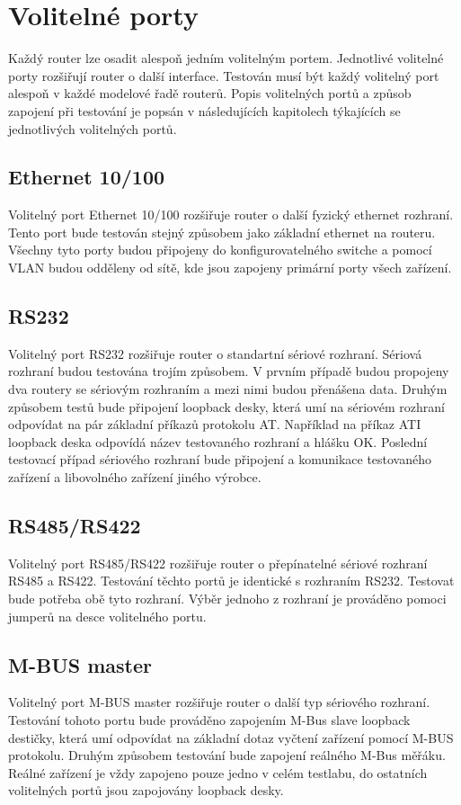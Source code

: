 \section{Volitelné porty}
Každý router lze osadit alespoň jedním volitelným portem. Jednotlivé volitelné porty rozšiřují router o další interface. Testován musí být každý volitelný port alespoň v každé modelové řadě routerů. Popis volitelných portů a způsob zapojení při testování je popsán v následujících kapitolech týkajících se jednotlivých volitelných portů.

\subsection{Ethernet 10/100}
Volitelný port Ethernet 10/100 rozšiřuje router o další fyzický ethernet rozhraní. Tento port bude testován stejný způsobem jako základní ethernet na routeru. Všechny tyto porty budou připojeny do konfigurovatelného switche a pomocí VLAN budou odděleny od sítě, kde jsou zapojeny primární porty všech zařízení.

\subsection{RS232}
Volitelný port RS232 rozšiřuje router o standartní sériové rozhraní. Sériová rozhraní budou testována trojím způsobem. V prvním případě budou propojeny dva routery se sériovým rozhraním a mezi nimi budou přenášena data. Druhým způsobem testů bude připojení loopback desky, která umí na sériovém rozhraní odpovídat na pár základní příkazů protokolu AT. Například na příkaz ATI loopback deska odpovídá název testovaného rozhraní a hlášku OK. Poslední testovací případ sériového rozhraní bude připojení a komunikace testovaného zařízení a libovolného zařízení jiného výrobce.

\subsection{RS485/RS422}
Volitelný port RS485/RS422 rozšiřuje router o přepínatelné sériové rozhraní RS485 a RS422. Testování těchto portů je identické s rozhraním RS232. Testovat bude potřeba obě tyto rozhraní. Výběr jednoho z rozhraní je prováděno pomoci jumperů na desce volitelného portu.

\subsection{M-BUS master}
Volitelný port M-BUS master rozšiřuje router o další typ sériového rozhraní. Testování tohoto portu bude prováděno zapojením M-Bus slave loopback destičky, která umí odpovídat na základní dotaz vyčtení zařízení pomocí M-BUS protokolu. Druhým způsobem testování bude zapojení reálného M-Bus měřáku. Reálné zařízení je vždy zapojeno pouze jedno v celém testlabu, do ostatních volitelných portů jsou zapojovány loopback desky.

